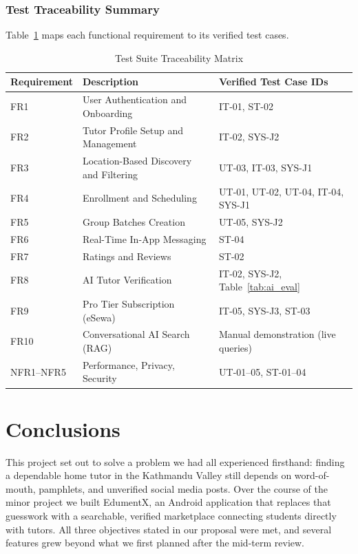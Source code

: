 \documentclass[12pt]{report}
\begin{document}
\subsection{Test Traceability Summary}
Table~\ref{tab:traceability} maps each functional requirement to its verified test cases.

\begin{table}[H]
\centering
\caption{Test Suite Traceability Matrix}
\label{tab:traceability}
\small
\begin{tabular}{|l|p{6.0cm}|p{6.0cm}|}
\hline
\textbf{Requirement} & \textbf{Description} & \textbf{Verified Test Case IDs} \\
\hline
FR1 & User Authentication and Onboarding & IT-01, ST-02 \\
\hline
FR2 & Tutor Profile Setup and Management & IT-02, SYS-J2 \\
\hline
FR3 & Location-Based Discovery and Filtering & UT-03, IT-03, SYS-J1 \\
\hline
FR4 & Enrollment and Scheduling & UT-01, UT-02, UT-04, IT-04, SYS-J1 \\
\hline
FR5 & Group Batches Creation & UT-05, SYS-J2 \\
\hline
FR6 & Real-Time In-App Messaging & ST-04 \\
\hline
FR7 & Ratings and Reviews & ST-02 \\
\hline
FR8 & AI Tutor Verification & IT-02, SYS-J2, Table~\ref{tab:ai_eval} \\
\hline
FR9 & Pro Tier Subscription (eSewa) & IT-05, SYS-J3, ST-03 \\
\hline
FR10 & Conversational AI Search (RAG) & Manual demonstration (live queries) \\
\hline
NFR1--NFR5 & Performance, Privacy, Security & UT-01--05, ST-01--04 \\
\hline
\end{tabular}
\end{table}



\newpage
\chapter{Conclusions}

This project set out to solve a problem we had all experienced firsthand: finding a dependable home tutor in the Kathmandu Valley still depends on word-of-mouth, pamphlets, and unverified social media posts. Over the course of the minor project we built EdumentX, an Android application that replaces that guesswork with a searchable, verified marketplace connecting students directly with tutors. All three objectives stated in our proposal were met, and several features grew beyond what we first planned after the mid-term review.
\end{document}
